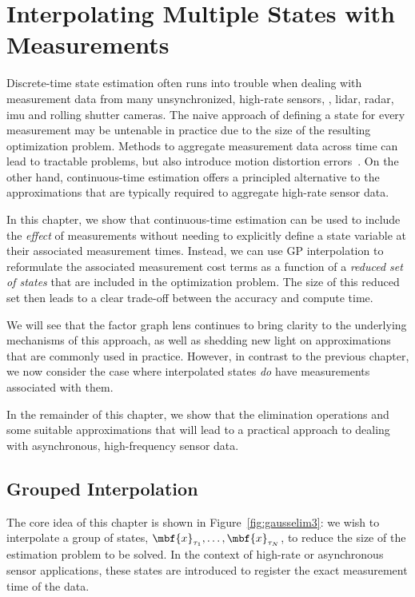 
\chapter{Interpolating Multiple States with Measurements}\label{chap:interp-during-solve}
Discrete-time state estimation often runs into trouble when dealing with measurement data from many unsynchronized, high-rate sensors, \eg, \ac{lidar}, \ac{radar}, \ac{imu} and rolling shutter cameras. The naive approach of defining a state for every measurement may be untenable in practice due to the size of the resulting optimization problem. Methods to aggregate measurement data across time can lead to tractable problems, but also introduce motion distortion errors~\citep{talbot_tro25}. 
On the other hand, continuous-time estimation offers a principled alternative to the approximations that are typically required to aggregate high-rate sensor data. 

In this chapter, we show that continuous-time estimation can be used to include the \emph{effect} of measurements without needing to explicitly define a state variable at their associated measurement times. Instead, we can use \ac{GP} interpolation to reformulate the associated measurement cost terms as a function of a \emph{reduced set of states} that are included in the optimization problem. The size of this reduced set then leads to a clear trade-off between the accuracy and compute time. 

We will see that the factor graph lens continues to bring clarity to the underlying mechanisms of this approach, as well as shedding new light on approximations that are commonly used in practice. However, in contrast to the previous chapter, we now consider the case where interpolated states \emph{do} have measurements associated with them.

In the remainder of this chapter, we show that the elimination operations and some suitable approximations that will lead to a practical approach to dealing with asynchronous, high-frequency sensor data.

\section{Grouped Interpolation}

The core idea of this chapter is shown in Figure~\ref{fig:gausselim3}: we wish to interpolate a group of states, $\mbf{x}_{\tau_1}, \ldots, \mbf{x}_{\tau_N}$, to reduce the size of the estimation problem to be solved. In the context of high-rate or asynchronous sensor applications, these states are introduced to register the exact measurement time of the data.

